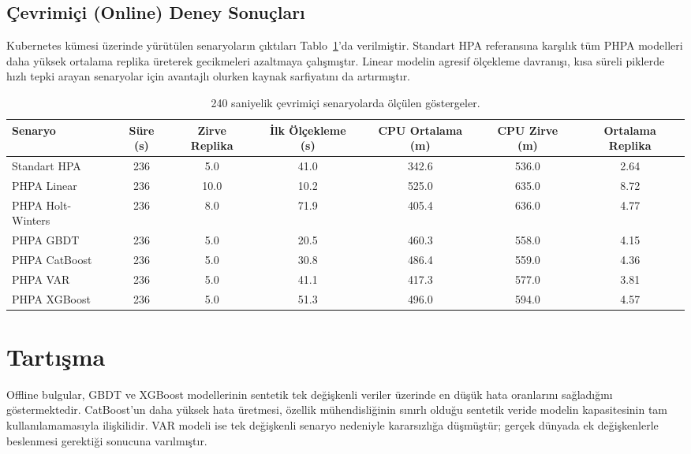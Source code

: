 \documentclass[12pt,a4paper]{article}
\begin{document}
\subsection{Çevrimiçi (Online) Deney Sonuçları}
Kubernetes kümesi üzerinde yürütülen senaryoların çıktıları Tablo~\ref{tab:online}’da verilmiştir. Standart HPA referansına karşılık tüm PHPA modelleri daha yüksek ortalama replika üreterek gecikmeleri azaltmaya çalışmıştır. Linear modelin agresif ölçekleme davranışı, kısa süreli piklerde hızlı tepki arayan senaryolar için avantajlı olurken kaynak sarfiyatını da artırmıştır.

\begin{table}[h]
    \centering
    \caption{240 saniyelik çevrimiçi senaryolarda ölçülen göstergeler.}
    \label{tab:online}
    \begin{tabular}{@{}lcccccc@{}}
        \toprule
        Senaryo & Süre (s) & Zirve Replika & İlk Ölçekleme (s) & CPU Ortalama (m) & CPU Zirve (m) & Ortalama Replika \\
        \midrule
        Standart HPA & 236 & 5.0 & 41.0 & 342.6 & 536.0 & 2.64 \\
        PHPA Linear & 236 & 10.0 & 10.2 & 525.0 & 635.0 & 8.72 \\
        PHPA Holt-Winters & 236 & 8.0 & 71.9 & 405.4 & 636.0 & 4.77 \\
        PHPA GBDT & 236 & 5.0 & 20.5 & 460.3 & 558.0 & 4.15 \\
        PHPA CatBoost & 236 & 5.0 & 30.8 & 486.4 & 559.0 & 4.36 \\
        PHPA VAR & 236 & 5.0 & 41.1 & 417.3 & 577.0 & 3.81 \\
        PHPA XGBoost & 236 & 5.0 & 51.3 & 496.0 & 594.0 & 4.57 \\
        \bottomrule
    \end{tabular}
\end{table}

\section{Tartışma}
Offline bulgular, GBDT ve XGBoost modellerinin sentetik tek değişkenli veriler üzerinde en düşük hata oranlarını sağladığını göstermektedir. CatBoost’un daha yüksek hata üretmesi, özellik mühendisliğinin sınırlı olduğu sentetik veride modelin kapasitesinin tam kullanılamamasıyla ilişkilidir. VAR modeli ise tek değişkenli senaryo nedeniyle kararsızlığa düşmüştür; gerçek dünyada ek değişkenlerle beslenmesi gerektiği sonucuna varılmıştır.
\end{document}
